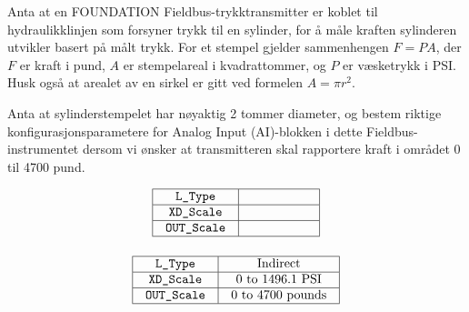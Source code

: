 

Anta at en FOUNDATION Fieldbus-trykktransmitter er koblet til hydraulikklinjen som forsyner trykk til en sylinder, for å måle kraften sylinderen utvikler basert på målt trykk. For et stempel gjelder sammenhengen $F = PA$, der $F$ er kraft i pund, $A$ er stempelareal i kvadrattommer, og $P$ er væsketrykk i PSI. Husk også at arealet av en sirkel er gitt ved formelen $A = \pi r^2$.

\vskip 10pt

Anta at sylinderstempelet har nøyaktig 2 tommer diameter, og bestem riktige konfigurasjonsparametere for Analog Input (AI)-blokken i dette Fieldbus-instrumentet dersom vi ønsker at transmitteren skal rapportere kraft i området 0 til 4700 pund.


$$\vbox{\offinterlineskip
\halign{\strut
\vrule \quad\hfil # \ \hfil & 
\vrule \quad\hfil # \ \hfil \vrule \cr
\noalign{\hrule}
%
{\tt L\_Type} & \hskip 50pt \cr
%
\noalign{\hrule}
%
{\tt XD\_Scale} & \hskip 50pt \cr
%
\noalign{\hrule}
%
{\tt OUT\_Scale} & \hskip 50pt \cr
%
\noalign{\hrule}
} %
}$$ %








$$\vbox{\offinterlineskip
\halign{\strut
\vrule \quad\hfil # \ \hfil & 
\vrule \quad\hfil # \ \hfil \vrule \cr
\noalign{\hrule}
%
{\tt L\_Type} & Indirect \cr
%
\noalign{\hrule}
%
{\tt XD\_Scale} & 0 to 1496.1 PSI \cr
%
\noalign{\hrule}
%
{\tt OUT\_Scale} & 0 to 4700 pounds \cr
%
\noalign{\hrule}
} %
}$$ %











